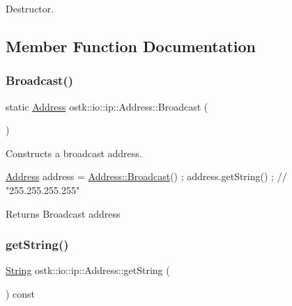 Destructor. 



\subsection{Member Function Documentation}
\mbox{\label{classostk_1_1io_1_1ip_1_1_address_a03652b01913b86e80d8a2a363626849a}} 
\subsubsection{\texorpdfstring{Broadcast()}{Broadcast()}}
{\footnotesize\ttfamily static \hyperlink{classostk_1_1io_1_1ip_1_1_address}{Address} ostk\+::io\+::ip\+::\+Address\+::\+Broadcast (\begin{DoxyParamCaption}{ }\end{DoxyParamCaption})\hspace{0.3cm}{\ttfamily [static]}}



Constructs a broadcast address. 


\begin{DoxyCode}
\hyperlink{classostk_1_1io_1_1ip_1_1_address_a4118f42388b11fb003c9fb782f4ca04f}{Address} address = \hyperlink{classostk_1_1io_1_1ip_1_1_address_a03652b01913b86e80d8a2a363626849a}{Address::Broadcast}() ;
address.getString() ; \textcolor{comment}{// "255.255.255.255"}
\end{DoxyCode}


\begin{DoxyReturn}{Returns}
Broadcast address 
\end{DoxyReturn}
\mbox{\label{classostk_1_1io_1_1ip_1_1_address_a3dde4b2601d3c2be6a6ab6af3663fa1a}} 
\subsubsection{\texorpdfstring{get\+String()}{getString()}}
{\footnotesize\ttfamily \hyperlink{namespaceostk_1_1io_1_1ip_a987b35b1bc61a18b66c2a45f9ce5536e}{String} ostk\+::io\+::ip\+::\+Address\+::get\+String (\begin{DoxyParamCaption}{ }\end{DoxyParamCaption}) const}



